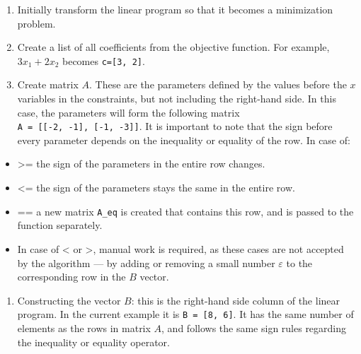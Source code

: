 \documentclass[11pt]{article}
\providecommand{\tightlist}{%
      \setlength{\itemsep}{0pt}\setlength{\parskip}{0pt}}
\begin{document}
\begin{enumerate}
\def\labelenumi{\arabic{enumi}.}
\tightlist
\item
  Initially transform the linear program so that it becomes a
  minimization problem.
\item
  Create a list of all coefficients from the objective function. For
  example, \(3x_1 + 2x_2\) becomes \texttt{c={[}3,\ 2{]}}.
\item
  Create matrix \(A\). These are the parameters defined by the values
  before the \(x\) variables in the constraints, but not including the
  right-hand side. In this case, the parameters will form the following
  matrix \texttt{A\ =\ {[}{[}-2,\ -1{]},\ {[}-1,\ -3{]}{]}}. It is
  important to note that the sign before every parameter depends on the
  inequality or equality of the row. In case of:
\end{enumerate}

\begin{itemize}
\tightlist
\item
  \textgreater= the sign of the parameters in the entire row changes.
\item
  \textless= the sign of the parameters stays the same in the entire
  row.
\item
  == a new matrix \texttt{A\_eq} is created that contains this row, and
  is passed to the function separately.
\item
  In case of \textless{} or \textgreater, manual work is required, as
  these cases are not accepted by the algorithm --- by adding or
  removing a small number \(\varepsilon\) to the corresponding row in
  the \(B\) vector.
\end{itemize}

\begin{enumerate}
\def\labelenumi{\arabic{enumi}.}
\setcounter{enumi}{3}
\tightlist
\item
  Constructing the vector \(B\): this is the right-hand side column of
  the linear program. In the current example it is
  \texttt{B\ =\ {[}8,\ 6{]}}. It has the same number of elements as the
  rows in matrix \(A\), and follows the same sign rules regarding the
  inequality or equality operator.
\end{enumerate}

\newpage
\end{document}
